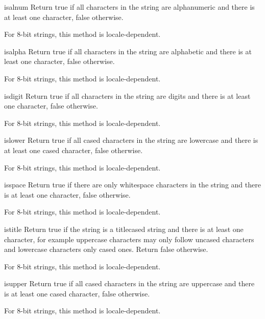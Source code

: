 \begin{methoddesc}[string]{isalnum}{}
Return true if all characters in the string are alphanumeric and there
is at least one character, false otherwise.

For 8-bit strings, this method is locale-dependent.
\end{methoddesc}

\begin{methoddesc}[string]{isalpha}{}
Return true if all characters in the string are alphabetic and there
is at least one character, false otherwise.

For 8-bit strings, this method is locale-dependent.
\end{methoddesc}

\begin{methoddesc}[string]{isdigit}{}
Return true if all characters in the string are digits and there
is at least one character, false otherwise.

For 8-bit strings, this method is locale-dependent.
\end{methoddesc}

\begin{methoddesc}[string]{islower}{}
Return true if all cased characters in the string are lowercase and
there is at least one cased character, false otherwise.

For 8-bit strings, this method is locale-dependent.
\end{methoddesc}

\begin{methoddesc}[string]{isspace}{}
Return true if there are only whitespace characters in the string and
there is at least one character, false otherwise.

For 8-bit strings, this method is locale-dependent.
\end{methoddesc}

\begin{methoddesc}[string]{istitle}{}
Return true if the string is a titlecased string and there is at least one
character, for example uppercase characters may only follow uncased
characters and lowercase characters only cased ones.  Return false
otherwise.

For 8-bit strings, this method is locale-dependent.
\end{methoddesc}

\begin{methoddesc}[string]{isupper}{}
Return true if all cased characters in the string are uppercase and
there is at least one cased character, false otherwise.

For 8-bit strings, this method is locale-dependent.
\end{methoddesc}

